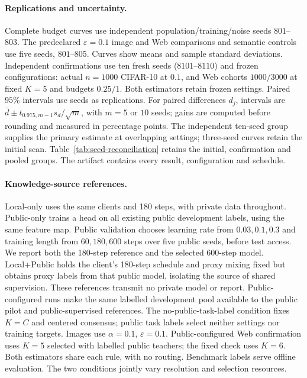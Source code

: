 \paragraph{Replications and uncertainty.}
Complete budget curves use independent population/training/noise seeds
$801$--$803$. The predeclared $\varepsilon=0.1$ image and Web comparisons and
semantic controls use five seeds, $801$--$805$. Curves show means and sample
standard deviations. Independent confirmations use ten fresh seeds
($8101$--$8110$) and frozen configurations: actual $n=1000$ CIFAR-10 at $0.1$,
and Web cohorts $1000/3000$ at fixed $K=5$ and budgets $0.25/1$.
Both estimators retain frozen settings. Paired $95\%$ intervals use seeds
as replications. For paired differences $d_j$, intervals are
$\bar d\pm t_{0.975,m-1}s_d/\sqrt m$, with $m=5$ or $10$ seeds;
gains are computed before rounding and measured in percentage points.
The independent ten-seed group supplies the primary estimate
at overlapping settings; three-seed curves retain the initial scan.
Table~\ref{tab:seed-reconciliation} retains the initial, confirmation and pooled groups.
The artifact contains every result, configuration and schedule.

\paragraph{Knowledge-source references.}
Local-only uses the same clients and 180 steps, with private data throughout.
Public-only trains a head on all existing public development labels, using the
same feature map. Public validation chooses learning rate from $0.03,0.1,0.3$
and training length from $60,180,600$ steps over five public seeds, before test
access. We report both the 180-step reference and the selected 600-step model.
Local+Public holds the client's 180-step schedule and proxy mixing fixed but
obtains proxy labels from that public model, isolating the source of shared
supervision. These references transmit no private model or report.
Public-configured runs make the same labelled development pool available to
the public pilot and public-supervised references. The no-public-task-label
condition fixes $K=C$ and centered consensus;
public task labels select neither settings nor training targets. Images use
$\alpha=0.1$, $\varepsilon=0.1$. Public-configured Web confirmation uses
$K=5$ selected with labelled public teachers; the fixed check uses $K=6$.
Both estimators share each rule, with no routing. Benchmark labels serve offline
evaluation. The two conditions jointly vary resolution and selection resources.

